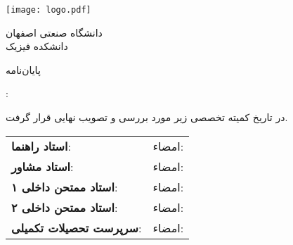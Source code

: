 \newpage
\thispagestyle{empty}
\noindent
\begin{center}
\vspace{-1cm}\centerline{{\texttt{[image: logo.pdf]}}}
{\Large{دانشگاه صنعتی اصفهان}\\
\Large{دانشکده فیزیک}


\large{پایان‌نامه}


\Large{}
\par
{\Large{}}
}
\by:
\end{center}
\vskip 1cm
در تاریخ     کمیته تخصصی زیر مورد بررسی و تصویب نهایی قرار گرفت.
\vskip 1cm
\begin{tabular}{p{10cm}p{2cm}}
\textbf{استاد راهنما}: & امضاء: \\[1.5cm]
\textbf{استاد مشاور}:  & امضاء: \\[1.5cm]
\textbf{استاد ممتحن داخلی ۱}: & امضاء: \\[1.5cm]
\textbf{استاد ممتحن داخلی ۲}:  & امضاء: \\[1.5cm]
\textbf{سرپرست تحصیلات تکمیلی}: & امضاء: \\[1.5cm]
\end{tabular}